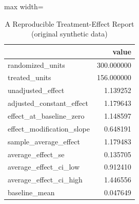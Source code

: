 \begin{table}[htbp]
\centering
\caption{A Reproducible Treatment-Effect Report (original synthetic data)}
\begingroup
\small
\setlength{\tabcolsep}{6pt}
\renewcommand{\arraystretch}{1.12}
\begin{adjustbox}{max width=\linewidth}
\begin{tabular}{@{}lr@{}}
\toprule
 & value \\
\midrule
randomized\_units & 300.000000 \\
treated\_units & 156.000000 \\
unadjusted\_effect & 1.139252 \\
adjusted\_constant\_effect & 1.179643 \\
effect\_at\_baseline\_zero & 1.148597 \\
effect\_modification\_slope & 0.648191 \\
sample\_average\_effect & 1.179483 \\
average\_effect\_se & 0.135705 \\
average\_effect\_ci\_low & 0.912410 \\
average\_effect\_ci\_high & 1.446556 \\
baseline\_mean & 0.047649 \\
\bottomrule
\end{tabular}
\end{adjustbox}
\endgroup
\end{table}